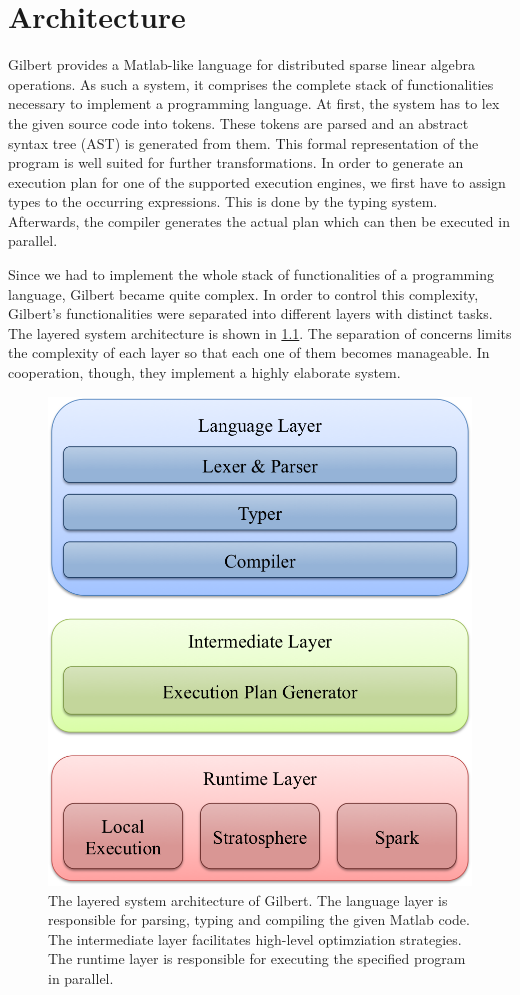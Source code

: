 \chapter{Architecture}
\label{cha:architecture}


Gilbert provides a Matlab-like language for distributed sparse linear algebra operations.
As such a system, it comprises the complete stack of functionalities necessary to implement a programming language.
At first, the system has to lex the given source code into tokens.
These tokens are parsed and an abstract syntax tree (AST) is generated from them.
This formal representation of the program is well suited for further transformations.
In order to generate an execution plan for one of the supported execution engines, we first have to assign types to the occurring expressions.
This is done by the typing system.
Afterwards, the compiler generates the actual plan which can then be executed in parallel.

Since we had to implement the whole stack of functionalities of a programming language, Gilbert became quite complex.
In order to control this complexity, Gilbert's functionalities were separated into different layers with distinct tasks.
The layered system architecture is shown in \cref{fig:systemArchitecture}.
The separation of concerns limits the complexity of each layer so that each one of them becomes manageable.
In cooperation, though, they implement a highly elaborate system.

\begin{figure}
	\centering
	\includegraphics[width=0.5\linewidth]{images/systemArchitecture.png}
	\caption{The layered system architecture of Gilbert. The language layer is responsible for parsing, typing and compiling the given Matlab code. The intermediate layer facilitates high-level optimziation strategies. The runtime layer is responsible for executing the specified program in parallel.}
	\label{fig:systemArchitecture}
\end{figure}

